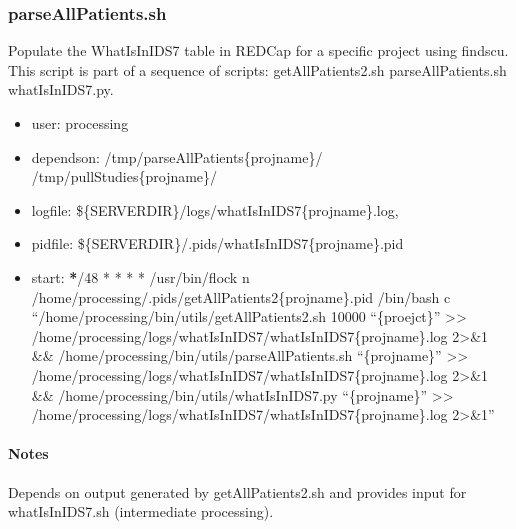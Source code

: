 \documentclass[letterpaper,10pt,english]{sphinxmanual}
\begin{document}
\sphinxstepscope


\subsubsection{parseAllPatients.sh}
\label{\detokenize{Architecture/scripts/parseAllPatients:parseallpatients-sh}}\label{\detokenize{Architecture/scripts/parseAllPatients::doc}}
\sphinxAtStartPar
Populate the WhatIsInIDS7 table in REDCap for a specific project using findscu. This script is part of a sequence of scripts: getAllPatients2.sh \sphinxhyphen{} parseAllPatients.sh \sphinxhyphen{} whatIsInIDS7.py.
\begin{itemize}
\item {} 
\sphinxAtStartPar
user: processing

\item {} 
\sphinxAtStartPar
depends\sphinxhyphen{}on:
\sphinxhyphen{} /tmp/parseAllPatients\{projname\}/
\sphinxhyphen{} /tmp/pullStudies\{projname\}/

\item {} 
\sphinxAtStartPar
log\sphinxhyphen{}file:
\sphinxhyphen{} \$\{SERVERDIR\}/logs/whatIsInIDS7\{projname\}.log,

\item {} 
\sphinxAtStartPar
pid\sphinxhyphen{}file: \$\{SERVERDIR\}/.pids/whatIsInIDS7\{projname\}.pid

\item {} 
\sphinxAtStartPar
start:
{\color{red}\bfseries{}*}/48 * * * * /usr/bin/flock \sphinxhyphen{}n /home/processing/.pids/getAllPatients2\{projname\}.pid /bin/bash \sphinxhyphen{}c “/home/processing/bin/utils/getAllPatients2.sh 10000 “\{proejct\}” \textgreater{}\textgreater{} /home/processing/logs/whatIsInIDS7/whatIsInIDS7\{projname\}.log 2\textgreater{}\&1 \&\& /home/processing/bin/utils/parseAllPatients.sh “\{projname\}” \textgreater{}\textgreater{} /home/processing/logs/whatIsInIDS7/whatIsInIDS7\{projname\}.log 2\textgreater{}\&1 \&\& /home/processing/bin/utils/whatIsInIDS7.py “\{projname\}” \textgreater{}\textgreater{} /home/processing/logs/whatIsInIDS7/whatIsInIDS7\{projname\}.log 2\textgreater{}\&1”

\end{itemize}


\paragraph{Notes}
\label{\detokenize{Architecture/scripts/parseAllPatients:notes}}
\sphinxAtStartPar
Depends on output generated by getAllPatients2.sh and provides input for whatIsInIDS7.sh (intermediate processing).
\end{document}
